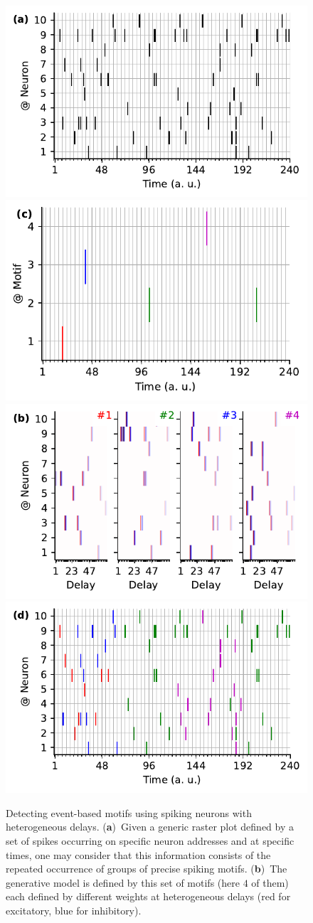 \documentclass[brainsci, %
               review,accept,pdftex,moreauthors
               ]{Definitions/mdpi}
\begin{document}
\begin{figure}[H]%
    \includegraphics[width=0.490\linewidth]{figures/THC_1a_k.pdf}
    \includegraphics[width=0.490\linewidth]{figures/THC_1c.pdf}
    \includegraphics[width=0.490\linewidth]{figures/THC_1b.pdf}
    \includegraphics[width=0.490\linewidth]{figures/THC_1a.pdf}
      \caption{
        Detecting event-based motifs using spiking neurons with heterogeneous delays.
      { (\textbf{a})}~Given a generic raster plot defined by a set of spikes occurring on specific neuron addresses and at specific times, one may consider that this information consists of the repeated occurrence of groups of precise spiking motifs. 
      { (\textbf{b})}~The generative model is defined by this set of motifs (here $4$ of them) each defined by different weights at heterogeneous delays (red for excitatory, blue for inhibitory). 
}
\end{figure}
\end{document}
